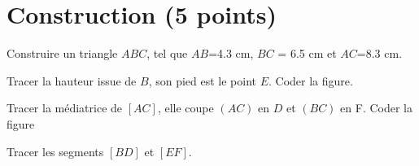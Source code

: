 \section{Construction (5 points)}

\begin{questions}
	\question[1] Construire un triangle $ABC$, tel que $AB$=\num{4.3} cm, $BC$ = \num{6.5} cm et $AC$=\num{8.3} cm.
	
	\question[1\half] Tracer la hauteur issue de $B$, son pied est le point $E$. Coder la figure.
	
	\question[1\half] Tracer la médiatrice de $[AC]$, elle coupe $(AC)$ en $D$ et $(BC)$ en F. Coder la figure
	
	\question[1] Tracer les segments $[BD]$ et $[EF]$. 
\end{questions}
  